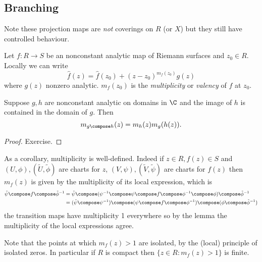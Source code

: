 \documentclass[a4paper]{article}
\begin{document}
\subsection{Branching}

Note these projection maps are \emph{not} coverings on \(R\) (or \(X\)) but they still have controlled behaviour.

\begin{definition}
  Let \(f: R \to S\) be an nonconstant analytic map of Riemann surfaces and \(z_0 \in R\). Locally we can write
  \[
    \hat f(z) = \hat f(z_0) + (z - z_0)^{m_f(z_0)} g(z)
  \]
  where \(g(z)\) nonzero analytic. \(m_f(z_0)\) is the \emph{multiplicity} or \emph{valency} of \(f\) at \(z_0\).
\end{definition}

\begin{lemma}
  Suppose \(g, h\) are nonconstant analytic on domains in \(\C\) and the image of \(h\) is contained in the domain of \(g\). Then
  \[
    m_{g \compose h}(z) = m_h(z) m_g(h(z)).
  \]
\end{lemma}

\begin{proof}
  Exercise.
\end{proof}

As a corollary, multiplicity is well-defined. Indeed if \(z \in R, f(z) \in S\) and \((U, \phi), (\tilde U, \tilde \phi)\) are charts for \(z\), \((V, \psi), (\tilde V, \tilde \psi)\) are charts for \(f(z)\) then \(m_f(z)\) is given by the multiplicity of its local expression, which is
\begin{align*}
  \tilde \psi \compose f \compose \tilde \phi^{-1}
  &= \tilde \psi \compose (\psi^{-1} \compose \psi \compose f \compose \phi^{-1} \compose \phi) \compose \tilde \phi^{-1} \\
  &= (\tilde \psi \compose \psi^{-1}) \compose (\psi \compose f \compose \phi^{-1}) \compose (\phi \compose \tilde \phi^{-1})
\end{align*}
the transition maps have multiplicity 1 everywhere so by the lemma the multiplicity of the local expressions agree.

Note that the points at which \(m_f(z) > 1\) are isolated, by the (local) principle of isolated zeros. In particular if \(R\) is compact then \(\{z \in R: m_f(z) > 1\}\) is finite. %
\end{document}
